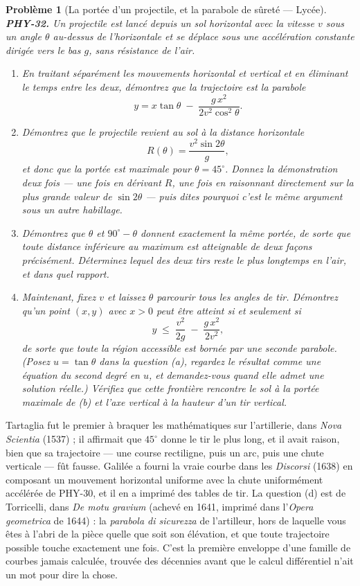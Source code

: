 \documentclass[11pt]{article}
\newtheorem{problem}{Problème}
\begin{document}
\begin{problem}[{La portée d'un projectile, et la parabole de sûreté --- Lycée}]
\textbf{PHY-32.} Un projectile est lancé depuis un sol horizontal avec la vitesse $ v $ sous
un angle $ \theta $ au-dessus de l'horizontale et se déplace sous une accélération constante
dirigée vers le bas $ g $, sans résistance de l'air.
\begin{enumerate}
\item[(a)] En traitant séparément les mouvements horizontal et vertical et en éliminant le temps entre
les deux, démontrez que la trajectoire est la parabole
\[ y = x\tan\theta \;-\; \frac{g\,x^{2}}{2v^{2}\cos^{2}\theta}. \]
\item[(b)] Démontrez que le projectile revient au sol à la distance horizontale
\[ R(\theta) = \frac{v^{2}\sin 2\theta}{g}, \]
et donc que la portée est maximale pour $ \theta = 45^{\circ} $. Donnez la démonstration
deux fois --- une fois en dérivant $ R $, une fois en raisonnant directement sur la plus grande
valeur de $ \sin 2\theta $ --- puis dites pourquoi c'est le même argument sous un autre
habillage.
\item[(c)] Démontrez que $ \theta $ et $ 90^{\circ} - \theta $ donnent exactement la même portée,
de sorte que toute distance inférieure au maximum est atteignable de deux façons précisément.
Déterminez lequel des deux tirs reste le plus longtemps en l'air, et dans quel rapport.
\item[(d)] Maintenant, fixez $ v $ et laissez $ \theta $ parcourir tous les angles de tir.
Démontrez qu'un point $ (x, y) $ avec $ x > 0 $ peut être atteint si et seulement si
\[ y \;\le\; \frac{v^{2}}{2g} \;-\; \frac{g\,x^{2}}{2v^{2}}, \]
de sorte que toute la région accessible est bornée par une seconde parabole. (Posez
$ u = \tan\theta $ dans la question (a), regardez le résultat comme une équation du second
degré en $ u $, et demandez-vous quand elle admet une solution réelle.) Vérifiez que cette
frontière rencontre le sol à la portée maximale de (b) et l'axe vertical à la hauteur d'un tir
vertical.
\end{enumerate}

\end{problem}

\noindent Tartaglia fut le premier à braquer les mathématiques sur l'artillerie, dans
\textit{Nova Scientia} (1537) ; il affirmait que $ 45^{\circ} $ donne le tir le plus long, et il
avait raison, bien que sa trajectoire --- une course rectiligne, puis un arc, puis une chute
verticale --- fût fausse. Galilée a fourni la vraie courbe dans les \textit{Discorsi} (1638) en
composant un mouvement horizontal uniforme avec la chute uniformément accélérée de PHY-30, et il
en a imprimé des tables de tir. La question (d) est de Torricelli, dans \textit{De motu gravium}
(achevé en 1641, imprimé dans l'\textit{Opera geometrica} de 1644) : la \textit{parabola di sicurezza}
de l'artilleur, hors de laquelle vous êtes à l'abri de la pièce quelle que soit son élévation, et
que toute trajectoire possible touche exactement une fois. C'est la première enveloppe d'une
famille de courbes jamais calculée, trouvée des décennies avant que le calcul différentiel n'ait
un mot pour dire la chose.
\end{document}
